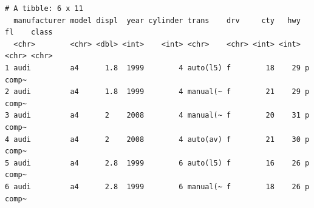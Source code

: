 \documentclass[
  11pt,
]{krantz}
\newenvironment{Shaded}{\begin{snugshade}}{\end{snugshade}}
\newcommand{\CommentTok}[1]{\textcolor[rgb]{0.37,0.37,0.37}{\textit{#1}}}
\newcommand{\DataTypeTok}[1]{\textcolor[rgb]{0.27,0.27,0.27}{#1}}
\newcommand{\DecValTok}[1]{\textcolor[rgb]{0.06,0.06,0.06}{#1}}
\newcommand{\KeywordTok}[1]{\textcolor[rgb]{0.27,0.27,0.27}{\textbf{#1}}}
\newcommand{\NormalTok}[1]{#1}
\newcommand{\OperatorTok}[1]{\textcolor[rgb]{0.43,0.43,0.43}{\textbf{#1}}}
\newcommand{\StringTok}[1]{\textcolor[rgb]{0.5,0.5,0.5}{#1}}
\begin{document}
\footnotesize

\begin{Shaded}
\end{Shaded}

\begin{verbatim}
# A tibble: 6 x 11
  manufacturer model displ  year cylinder trans    drv     cty   hwy fl    class
  <chr>        <chr> <dbl> <int>    <int> <chr>    <chr> <int> <int> <chr> <chr>
1 audi         a4      1.8  1999        4 auto(l5) f        18    29 p     comp~
2 audi         a4      1.8  1999        4 manual(~ f        21    29 p     comp~
3 audi         a4      2    2008        4 manual(~ f        20    31 p     comp~
4 audi         a4      2    2008        4 auto(av) f        21    30 p     comp~
5 audi         a4      2.8  1999        6 auto(l5) f        16    26 p     comp~
6 audi         a4      2.8  1999        6 manual(~ f        18    26 p     comp~
\end{verbatim}

\begin{Shaded}
\end{Shaded}
\end{document}
